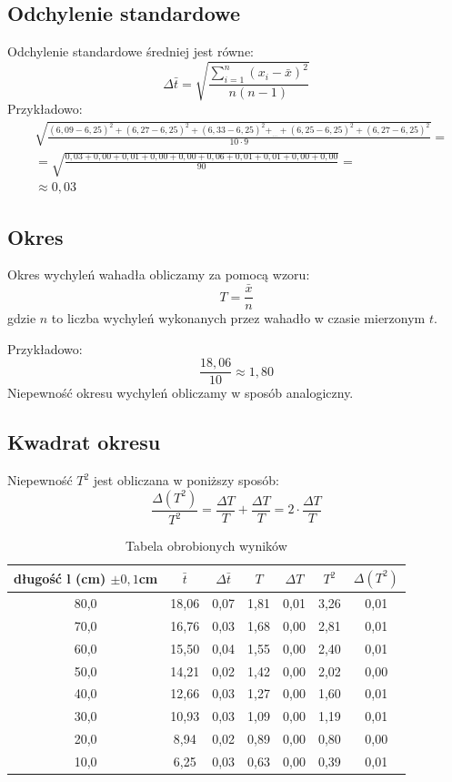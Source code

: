 \documentclass[a4paper,12pt]{article}
\begin{document}
\subsection*{Odchylenie standardowe}
Odchylenie standardowe średniej jest równe:
\[ \Delta \bar{t} = \sqrt{\frac{\sum \limits^n_{i = 1}\left( x_i - \bar{x}\right)^2}{n\left(n-1 \right)}}\]
Przykładowo:
\begin{align*}
		&\sqrt{\frac{\left( 6,09- 6,25 \right)^2 +
		\left( 6,27- 6,25 \right)^2 +
		\left( 6,33- 6,25 \right)^2 +_{\dots} +
		\left( 6,25- 6,25 \right)^2 +
		\left( 6,27 - 6,25 \right)^2}{10 \cdot 9}} =\\
		&= \sqrt{\frac{0,03 + 0,00 + 0,01 + 0,00 + 0,00 + 0,06 + 0,01 + 0,01 + 0,00 + 0,00}{90}} = \\
		&\approx 0,03
\end{align*}

\subsection*{Okres}

Okres wychyleń wahadła obliczamy za pomocą wzoru:
\[ T = \frac{\bar{x}}{n}\]
gdzie $n$ to liczba wychyleń wykonanych przez wahadło w czasie mierzonym $t$.

Przykładowo:
\[ \frac{18,06}{10} \approx 1,80 \]
Niepewność okresu wychyleń obliczamy w sposób analogiczny.

\subsection*{Kwadrat okresu}

Niepewność $T^2$ jest obliczana w poniższy sposób:
\[\frac{\Delta \left(T^2\right)}{T^2} = \frac{\Delta T}{T} + \frac{\Delta T}{T} = 2 \cdot \frac{\Delta T}{T}\]

\begin{table}[h]
		\centering
		\begin{tabular}{|c|c|c|c|c|c|c|}
				\hline
				długość l (cm) $\pm 0,1$cm & $\bar{t}$ & $\Delta \bar{t}$ & $T$ & $\Delta T$ & $T^2$ & $\Delta \left( T^2 \right)$ \\ \hline 
  80,0  & 18,06 & 0,07 & 1,81 & 0,01 & 3,26 & 0,01\\
  70,0  & 16,76 & 0,03 & 1,68 & 0,00 & 2,81 & 0,01\\
  60,0  & 15,50 & 0,04 & 1,55 & 0,00 & 2,40 & 0,01\\
  50,0  & 14,21 & 0,02 & 1,42 & 0,00 & 2,02 & 0,00\\
  40,0  & 12,66 & 0,03 & 1,27 & 0,00 & 1,60 & 0,01\\
  30,0  & 10,93 & 0,03 & 1,09 & 0,00 & 1,19 & 0,01\\
  20,0  & 8,94 & 0,02 & 0,89 & 0,00 & 0,80 & 0,00\\
  10,0  & 6,25 & 0,03 & 0,63 & 0,00 & 0,39 & 0,01\\\hline 

		\end{tabular}
		\caption{Tabela obrobionych wyników}
		\label{tab:obrobione}
\end{table}
\end{document}
